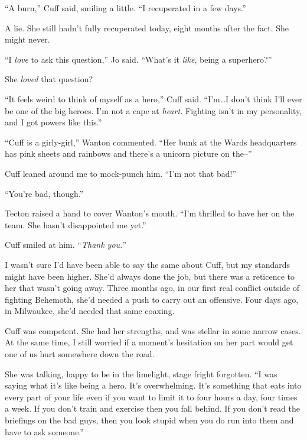 ``A burn,'' Cuff said, smiling a little.  ``I recuperated in a few days.''



A lie.  She still hadn't fully recuperated today, eight months after the fact.  She might never.



``I \emph{love} to ask this question,'' Jo said.  ``What's it \emph{like}, being a superhero?''



She \emph{loved} that question?



``It feels weird to think of myself as a hero,'' Cuff said.  ``I'm\ldots I don't think I'll ever be one of the big heroes.  I'm not a cape at \emph{heart.}  Fighting isn't in my personality, and I got powers like this.''



``Cuff is a girly-girl,'' Wanton commented.  ``Her bunk at the Wards headquarters has pink sheets and rainbows and there's a unicorn picture on the--''



Cuff leaned around me to mock-punch him.  ``I'm not that bad!''



``You're bad, though.''



Tecton raised a hand to cover Wanton's mouth.  ``I'm thrilled to have her on the team.  She hasn't disappointed me yet.''



Cuff smiled at him.  ``\emph{Thank you.}''



I wasn't sure I'd have been able to say the same about Cuff, but my standards might have been higher.  She'd always done the job, but there was a reticence to her that wasn't going away.  Three months ago, in our first real conflict outside of fighting Behemoth, she'd needed a push to carry out an offensive.  Four days ago, in Milwaukee, she'd needed that same coaxing.



Cuff was competent.  She had her strengths, and was stellar in some narrow cases.  At the same time, I still worried if a moment's hesitation on her part would get one of us hurt somewhere down the road.



She was talking, happy to be in the limelight, stage fright forgotten.  ``I was saying what it's like being a hero.  It's overwhelming.  It's something that eats into every part of your life even if you want to limit it to four hours a day, four times a week.  If you don't train and exercise then you fall behind.  If you don't read the briefings on the bad guys, then you look stupid when you do run into them and have to ask someone.''



